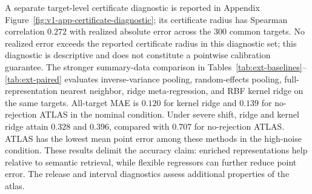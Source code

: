 \documentclass[11pt]{article}
\numberwithin{equation}{section}
\newcommand{\1}{\mathbf 1}
\begin{document}
A separate target-level certificate diagnostic is reported in Appendix Figure~\ref{fig:v1-app-certificate-diagnostic}; its certificate radius has Spearman correlation $0.272$ with realized absolute error across the 300 common targets.  No realized error exceeds the reported certificate radius in this diagnostic set; this diagnostic is descriptive and does not constitute a pointwise calibration guarantee.
The stronger summary-data comparison in Tables~\ref{tab:ext-baselines}--\ref{tab:ext-paired} evaluates inverse-variance pooling, random-effects pooling, full-representation nearest neighbor, ridge meta-regression, and RBF kernel ridge on the same targets. All-target MAE is $0.120$ for kernel ridge and $0.139$ for no-rejection ATLAS in the nominal condition. Under severe shift, ridge and kernel ridge attain $0.328$ and $0.396$, compared with $0.707$ for no-rejection ATLAS. ATLAS has the lowest mean point error among these methods in the high-noise condition. These results delimit the accuracy claim: enriched representations help relative to semantic retrieval, while flexible regressors can further reduce point error. The release and interval diagnostics assess additional properties of the atlas.
\end{document}
